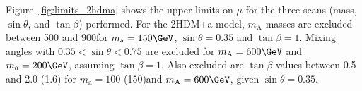 

Figure~\ref{fig:limits_2hdma} shows the upper limits on $\mu$ for the three scans (mass, $\sin\theta$, and $\tan\beta$) performed.
For the 2HDM+a model, $m_\text{A}$ masses are excluded between 500 and 900\GeV for $m_\text{a}=150\GeV$, $\sin\theta=0.35$ and $\tan\beta=1$. Mixing angles with $0.35<\sin\theta<0.75$ are excluded for $m_\text{A}=600\GeV$ and $m_\text{a}=200\GeV$, assuming $\tan\beta=1$. Also excluded are $\tan\beta$ values between 0.5 and 2.0 (1.6) for $m_\text{a}=100$ (150)\GeV and $m_\text{A}=600\GeV$, given $\sin\theta=0.35$. 

